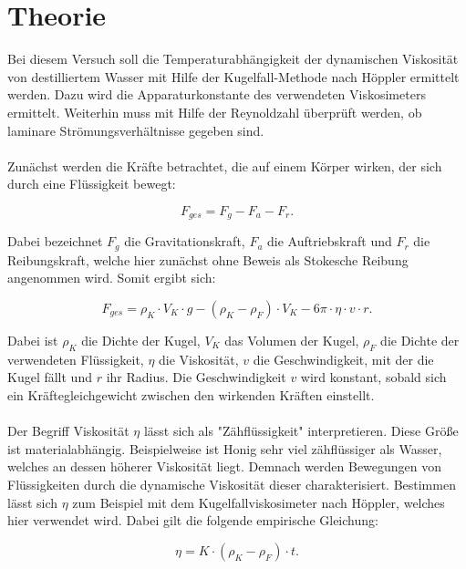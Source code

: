 \section{Theorie}
\label{sec:Theorie}

Bei diesem Versuch soll die Temperaturabhängigkeit der dynamischen 
Viskosität von destilliertem Wasser mit Hilfe der Kugelfall-Methode nach 
Höppler ermittelt werden. Dazu wird die Apparaturkonstante des 
verwendeten Viskosimeters ermittelt. Weiterhin muss mit Hilfe der 
Reynoldzahl überprüft werden, ob laminare Strömungsverhältnisse gegeben 
sind. \\
\\Zunächst werden die Kräfte betrachtet, die auf einem Körper wirken, der
sich durch eine Flüssigkeit bewegt: 

\begin{equation}
F_{ges} = F_g - F_a - F_r.
\end{equation}

Dabei bezeichnet $F_g$ die Gravitationskraft, $F_a$ die Auftriebskraft und 
$F_r$ die Reibungskraft, welche hier zunächst ohne Beweis als Stokesche 
Reibung angenommen wird. Somit ergibt sich: 

\begin{equation}
F_{ges} = \rho _K\cdot V_K\cdot g - (\rho _K - \rho _F)\cdot V_K - 6\pi\cdot \eta \cdot v\cdot r.
\end{equation}

Dabei ist $\rho _K$ die Dichte der Kugel, $V_K$ das Volumen der Kugel, 
$\rho _F$ die Dichte der verwendeten Flüssigkeit, $\eta$ die Viskosität, 
$v$ die Geschwindigkeit, mit der die Kugel fällt und $r$ ihr Radius. 
Die Geschwindigkeit $v$ wird konstant, sobald sich ein Kräftegleichgewicht 
zwischen den wirkenden Kräften einstellt. \\
\\Der Begriff Viskosität $\eta$ lässt sich als "Zähflüssigkeit" interpretieren.
Diese Größe ist materialabhängig. Beispielweise ist Honig sehr viel zähflüssiger als Wasser,
welches an dessen höherer Viskosität liegt. 
Demnach werden Bewegungen von Flüssigkeiten durch die dynamische Viskosität dieser 
charakterisiert. 
Bestimmen lässt sich $\eta$ zum Beispiel mit dem Kugelfallviskosimeter nach 
Höppler, welches hier verwendet wird. Dabei gilt die folgende empirische Gleichung: 

\begin{equation}
\eta = K\cdot (\rho _K - \rho _F)\cdot t.
\label{eqn:Viskosität}
\end{equation}

